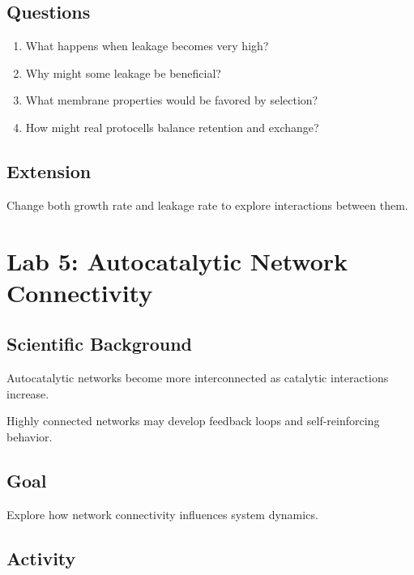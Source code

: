 \documentclass[
  oneside,
  openany]{book}
\providecommand{\tightlist}{%
  \setlength{\itemsep}{0pt}\setlength{\parskip}{0pt}}
\begin{document}
\subsection{Questions}\label{questions-3}

\begin{enumerate}
\def\labelenumi{\arabic{enumi}.}
\tightlist
\item
  What happens when leakage becomes very high?
\item
  Why might some leakage be beneficial?
\item
  What membrane properties would be favored by selection?
\item
  How might real protocells balance retention and exchange?
\end{enumerate}

\subsection{Extension}\label{extension-3}

Change both growth rate and leakage rate to explore interactions between them.

\section{Lab 5: Autocatalytic Network Connectivity}\label{lab-5-autocatalytic-network-connectivity}

\subsection{Scientific Background}\label{scientific-background-4}

Autocatalytic networks become more interconnected as catalytic interactions increase.

Highly connected networks may develop feedback loops and self-reinforcing behavior.

\subsection{Goal}\label{goal-4}

Explore how network connectivity influences system dynamics.

\subsection{Activity}\label{activity-4}
\end{document}
